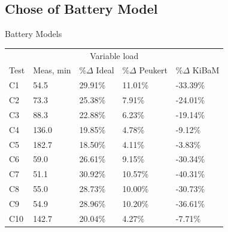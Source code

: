 \subsection{Chose of Battery Model}
\begin{frame}[fragile]{Battery Models}{\insertsubsection}
\begin{table}[]
	\centering
	\begin{tabular}{lllll}
		\multicolumn{5}{c}{Variable load} \\
		\rowcolor[HTML]{EFEFEF} 
		Test & Meas, min & \%$\Delta$ Ideal & \%$\Delta$ Peukert & \%$\Delta$ KiBaM \\
		C1 & 54.5 & 29.91\% & 11.01\% & -33.39\% \\
		\rowcolor[HTML]{EFEFEF} 
		C2 & 73.3 & 25.38\% & 7.91\% & -24.01\% \\
		C3 & 88.3 & 22.88\% & 6.23\% & -19.14\% \\
		\rowcolor[HTML]{EFEFEF} 
		C4 & 136.0 & 19.85\% & 4.78\% & -9.12\% \\
		C5 & 182.7 & 18.50\% & 4.11\% & -3.83\% \\
		\rowcolor[HTML]{EFEFEF} 
		C6 & 59.0 & 26.61\% & 9.15\% & -30.34\% \\
		C7 & 51.1 & 30.92\% & 10.57\% & -40.31\% \\
		\rowcolor[HTML]{EFEFEF} 
		C8 & 55.0 & 28.73\% & 10.00\% & -30.73\% \\
		C9 & 54.9 & 28.96\% & 10.20\% & -36.61\% \\
		\rowcolor[HTML]{EFEFEF} 
		C10 & 142.7 & 20.04\% & 4.27\% & -7.71\%
	\end{tabular}
\end{table}
\end{frame}

